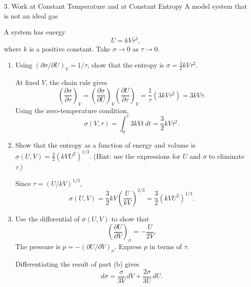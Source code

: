\documentclass[11pt]{article}
\begin{document}
\begin{problem}{3. Work at Constant Temperature and at Constant Entropy}
A model system that is not an ideal gas

A system has energy
\begin{equation}
  \label{eq:p3-energy}
  U=kV\tau^3,
\end{equation}
where \(k\) is a positive constant.
Take \(\sigma\to0\) as \(\tau\to0\).
\begin{enumerate}[label=(\alph*)]
  \item Using \((\partial\sigma/\partial U)_V=1/\tau\), show that the entropy is \(\sigma=\frac32 kV\tau^2\).
  \begin{answer}
At fixed \(V\), the chain rule gives
\begin{equation}
\label{eq:p3-entropy-derivative}
\left(\frac{\partial\sigma}{\partial\tau}\right)_V
=\left(\frac{\partial\sigma}{\partial U}\right)_V
\left(\frac{\partial U}{\partial\tau}\right)_V
=\frac{1}{\tau}(3kV\tau^2)=3kV\tau.
\end{equation}
Using the zero-temperature condition,
\begin{equation}
\label{eq:p3-entropy-result}
\sigma(V,\tau)=\int_0^\tau 3kVt\,dt=\boxed{\frac32kV\tau^2}.
\end{equation}
\end{answer}
\item Show that the entropy as a function of energy and volume is \(\sigma(U,V)=\frac32(kVU^2)^{1/3}\).
  (Hint: use the expressions for \(U\) and \(\sigma\) to eliminate \(\tau\).)
  \begin{answer}
Since \(\tau=(U/kV)^{1/3}\),
\begin{equation}
\label{eq:p3-entropy-uv}
\sigma(U,V)=\frac32kV\left(\frac{U}{kV}\right)^{2/3}
=\boxed{\frac32(kVU^2)^{1/3}}.
\end{equation}
\end{answer}
\item Use the differential of \(\sigma(U,V)\) to show that
  \begin{equation}
    \label{eq:p3-isentropic-derivative}
    \left(\frac{\partial U}{\partial V}\right)_\sigma=-\frac{U}{2V}.
  \end{equation}
  The pressure is \(p=-(\partial U/\partial V)_\sigma\).
  Express \(p\) in terms of \(\tau\).
  \begin{answer}
Differentiating the result of part (b) gives
\begin{equation}
\label{eq:p3-entropy-differential}
d\sigma=\frac{\sigma}{3V}\,dV+\frac{2\sigma}{3U}\,dU.

\end{equation}
\end{answer}
\end{enumerate}
\end{problem}
\end{document}
